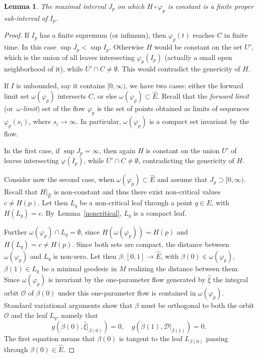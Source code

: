 \documentclass[JEP,XML,SOM,Unicode]{cedram}
\let\mathcal\mathscr
\newtheorem{lemma}[theorem]{Lemma}
\theoremstyle{definition}
\theoremstyle{remark}
\numberwithin{equation}{section}
\begin{document}
\begin{lemma}\label{maxinterval}
The maximal interval $J_p$ on which $H\circ \varphi_p$ is constant is a finite proper sub-interval of $I_p$.
\end{lemma}
\begin{proof}
If $I_p$ has a finite supremum (or infimum), then $\varphi_p(t)$
reaches $C$ in finite time. In this case $\sup J_p <\sup I_p$. Otherwise $H$ would be constant on the set
$U'$, which is the union of all leaves intersecting $\varphi_p(I_p)$
(actually a small open neighborhood of it), while $\overline{U'}\cap C\neq \emptyset$.
This would contradict the genericity of $H$.

If $I$ is unbounded, say it contains $[0,\infty)$, we have two cases:
either the forward limit set $\omega(\varphi_p)$ intersects $C$, or else $\omega(\varphi_p)\subset \widehat{E}$.
Recall that the \emph{forward limit} (or~\emph{$\omega$-limit}) set of the flow
$\varphi_p$ is the set of points obtained as limits of sequences
$\varphi_p(s_i)$, where $s_i\to \infty$. In particular, $\omega(\varphi_p)$ is a compact set
invariant by the flow.

In the first case, if $\sup J_p=\infty$, then again
$H$ is constant on the union $U'$ of leaves intersecting $\varphi(I_p)$,
while $\overline{U'}\cap C\neq \emptyset$,
contradicting the genericity of $H$.

Consider now the second case, when $\omega(\varphi_p)\subset \widehat{E}$ and assume that $J_p\supset [0,\infty)$.
Recall that $H|_{\widehat{E}}$ is non-constant and thus there exist non-critical values $c\neq H(p)$.
Let then $L_q$ be a non-critical leaf through a point $q\in E$, with $H(L_q)=c$.
By~Lemma~\ref{noncritical}, $L_q$ is a compact leaf.

Further $\omega(\varphi_p)\cap L_q=\emptyset$, since $H(\omega(\varphi_p))=H(p)$ and
$H(L_q)=c\neq H(p)$. Since both sets are compact, the distance between $\omega(\varphi_p)$ and $L_q$ is non-zero.
Let then $\beta:[0,1]\to \widehat{E}$, with $\beta(0)\in \omega(\varphi_p)$, $\beta(1)\in L_q$
be a minimal geodesic in $M$ realizing the distance
between them.
Since $\omega(\varphi_p)$ is invariant by the one-parameter flow generated by $\widehat{\xi}$
the integral orbit $\mathcal O$ of $\beta(0)$ under this one-parameter flow is
contained in $\omega(\varphi_p)$.
Standard variational arguments show that $\beta$ must be orthogonal to both
the orbit $\mathcal O$ and the leaf $L_q$, namely that
\[g(\dot{\beta}(0),\widehat{\xi}|_{\beta(0)})=0, \quad g(\dot{\beta}(1), \mathcal D|_{\beta(1)})=0.
\]
The first equation means that $\dot{\beta(0)}$ is tangent to the leaf
$L_{\beta(0)}$ passing through \hbox{$\beta(0)\in \widehat{E}$}.


\end{proof}
\end{document}
